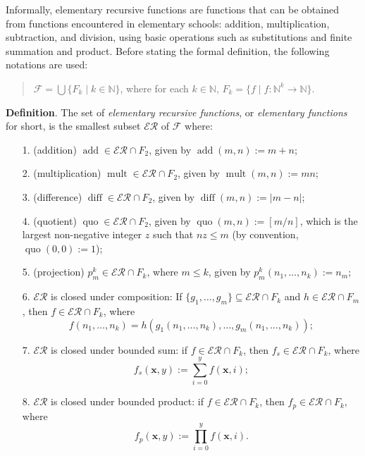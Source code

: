 \documentclass[12pt]{article}
\begin{document}
Informally, elementary recursive functions are functions that can be obtained from functions encountered in elementary schools: addition, multiplication, subtraction, and division, using basic operations such as substitutions and finite summation and product.  Before stating the formal definition, the following notations are used:
\begin{quote} $\mathcal{F} = \bigcup \lbrace F_k \mid k \in \mathbb{N}
\rbrace$, where for each $k \in \mathbb{N}\text{, }F_k = \lbrace f \mid f \colon \mathbb{N}^{k}
\to \mathbb{N} \rbrace$. \end{quote}

\textbf{Definition}.  The set of \emph{elementary recursive functions}, or \emph{elementary functions} for short, is the smallest subset $\mathcal{ER}$ of $\mathcal{F}$ where:
	\begin{enumerate}
		\item[1.] (addition) $\operatorname{add} \in \mathcal{ER}\cap F_2$, given by $\operatorname{add}(m,n):=m+n$;
		\item[2.] (multiplication) $\operatorname{mult} \in \mathcal{ER}\cap F_2$, given by $\operatorname{mult}(m,n):=mn$;
		\item[3.] (difference) $\operatorname{diff} \in \mathcal{ER}\cap F_2$, given by $\operatorname{diff}(m,n):=|m-n|$;
		\item[4.] (quotient) $\operatorname{quo} \in \mathcal{ER}\cap F_2$, given by $\operatorname{quo}(m,n):=[m/n]$, which is the largest non-negative integer $z$ such that $nz\le m$ (by convention, $\operatorname{quo}(0,0):=1$);
                \item[5.] (projection) $p^k_m \in \mathcal{ER}\cap F_k$, where $m\le k$, given by $p^k_m(n_1,\ldots,n_k):=n_m$;
		\item[6.] $\mathcal{ER}$ is closed under composition: If $\lbrace g_1, \ldots, g_m \rbrace \subseteq \mathcal{ER} \cap F_{k}$ and $h \in \mathcal{ER} \cap F_m$, then $f \in \mathcal{ER} \cap F_{k}$, where 
		$$f(n_1,\ldots, n_k) = h(g_1(n_1,  \ldots, n_k), \ldots, g_m(n_1,\ldots, n_k));$$
		
		\item[7.] $\mathcal{ER}$ is closed under bounded sum: if $f\in \mathcal{ER}\cap F_k$, then $f_s \in \mathcal{ER}\cap F_k$, where
$$f_s(\boldsymbol{x},y):=\sum_{i=0}^y f(\boldsymbol{x},i);$$
		\item[8.] $\mathcal{ER}$ is closed under bounded product: if $f\in \mathcal{ER}\cap F_k$, then $f_p \in \mathcal{ER}\cap F_k$, where
$$f_p(\boldsymbol{x},y):=\prod_{i=0}^y f(\boldsymbol{x},i).$$
	\end{enumerate}
\end{document}
